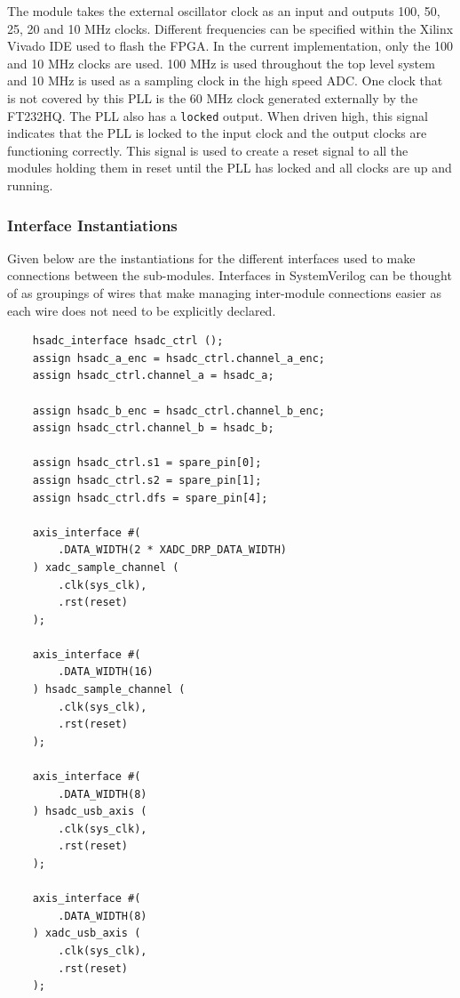 \documentclass[letterpaper,11pt]{article}
\newcommand{\code}[1]{\texttt{#1}}
\begin{document}
The module takes the external oscillator clock as an input and outputs 100, 50,
25, 20 and 10 MHz clocks. Different frequencies can be specified within the
Xilinx Vivado IDE used to flash the FPGA. In the current implementation, only
the 100 and 10 MHz clocks are used. 100 MHz is used throughout the top level
system and 10 MHz is used as a sampling clock in the high speed ADC. One clock
that is not covered by this PLL is the 60 MHz clock generated externally by the
FT232HQ. The PLL also has a \code{locked} output. When driven high, this signal
indicates that the PLL is locked to the input clock and the output clocks are
functioning correctly. This signal is used to create a reset signal to all the
modules holding them in reset until the PLL has locked and all clocks are up and
running.

\subsubsection{Interface Instantiations} \label{sec:interface-inst}

Given below are the instantiations for the different interfaces used to make
connections between the sub-modules. Interfaces in SystemVerilog can be thought
of as groupings of wires that make managing inter-module connections easier as
each wire does not need to be explicitly declared.

\begin{verbatim}
    hsadc_interface hsadc_ctrl ();
    assign hsadc_a_enc = hsadc_ctrl.channel_a_enc;
    assign hsadc_ctrl.channel_a = hsadc_a;

    assign hsadc_b_enc = hsadc_ctrl.channel_b_enc;
    assign hsadc_ctrl.channel_b = hsadc_b;

    assign hsadc_ctrl.s1 = spare_pin[0];
    assign hsadc_ctrl.s2 = spare_pin[1];
    assign hsadc_ctrl.dfs = spare_pin[4];

    axis_interface #(
        .DATA_WIDTH(2 * XADC_DRP_DATA_WIDTH)
    ) xadc_sample_channel (
        .clk(sys_clk),
        .rst(reset)
    );

    axis_interface #(
        .DATA_WIDTH(16)
    ) hsadc_sample_channel (
        .clk(sys_clk),
        .rst(reset)
    );

    axis_interface #(
        .DATA_WIDTH(8)
    ) hsadc_usb_axis (
        .clk(sys_clk),
        .rst(reset)
    );

    axis_interface #(
        .DATA_WIDTH(8)
    ) xadc_usb_axis (
        .clk(sys_clk),
        .rst(reset)
    );
\end{verbatim}
\end{document}
